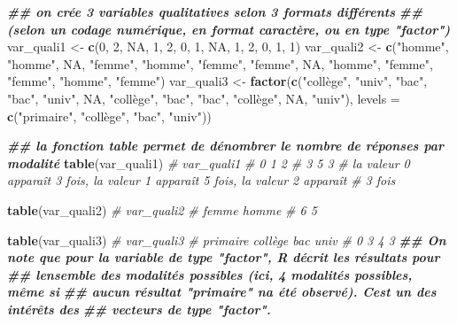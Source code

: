\documentclass[
]{book}
\newenvironment{Shaded}{\begin{snugshade}}{\end{snugshade}}
\newcommand{\AttributeTok}[1]{\textcolor[rgb]{0.13,0.29,0.53}{#1}}
\newcommand{\CommentTok}[1]{\textcolor[rgb]{0.56,0.35,0.01}{\textit{#1}}}
\newcommand{\ConstantTok}[1]{\textcolor[rgb]{0.56,0.35,0.01}{#1}}
\newcommand{\DecValTok}[1]{\textcolor[rgb]{0.00,0.00,0.81}{#1}}
\newcommand{\DocumentationTok}[1]{\textcolor[rgb]{0.56,0.35,0.01}{\textbf{\textit{#1}}}}
\newcommand{\FunctionTok}[1]{\textcolor[rgb]{0.13,0.29,0.53}{\textbf{#1}}}
\newcommand{\NormalTok}[1]{#1}
\newcommand{\OtherTok}[1]{\textcolor[rgb]{0.56,0.35,0.01}{#1}}
\newcommand{\StringTok}[1]{\textcolor[rgb]{0.31,0.60,0.02}{#1}}
\begin{document}
\begin{Shaded}
\begin{Highlighting}[]
\DocumentationTok{\#\# on crée 3 variables qualitatives selon 3 formats différents }
\DocumentationTok{\#\# (selon un codage numérique, en format caractère, ou en type "factor")}
\NormalTok{var\_quali1 }\OtherTok{\textless{}{-}} \FunctionTok{c}\NormalTok{(}\DecValTok{0}\NormalTok{, }\DecValTok{2}\NormalTok{, }\ConstantTok{NA}\NormalTok{, }\DecValTok{1}\NormalTok{, }\DecValTok{2}\NormalTok{, }\DecValTok{0}\NormalTok{, }\DecValTok{1}\NormalTok{, }\ConstantTok{NA}\NormalTok{, }\DecValTok{1}\NormalTok{, }\DecValTok{2}\NormalTok{, }\DecValTok{0}\NormalTok{, }\DecValTok{1}\NormalTok{, }\DecValTok{1}\NormalTok{)}
\NormalTok{var\_quali2 }\OtherTok{\textless{}{-}} \FunctionTok{c}\NormalTok{(}\StringTok{"homme"}\NormalTok{, }\StringTok{"homme"}\NormalTok{, }\ConstantTok{NA}\NormalTok{, }\StringTok{"femme"}\NormalTok{, }\StringTok{"homme"}\NormalTok{, }\StringTok{"femme"}\NormalTok{, }\StringTok{"femme"}\NormalTok{, }\ConstantTok{NA}\NormalTok{, }
                \StringTok{"homme"}\NormalTok{, }\StringTok{"femme"}\NormalTok{, }\StringTok{"femme"}\NormalTok{, }\StringTok{"homme"}\NormalTok{, }\StringTok{"femme"}\NormalTok{)}
\NormalTok{var\_quali3 }\OtherTok{\textless{}{-}} \FunctionTok{factor}\NormalTok{(}\FunctionTok{c}\NormalTok{(}\StringTok{"collège"}\NormalTok{, }\StringTok{"univ"}\NormalTok{, }\StringTok{"bac"}\NormalTok{, }\StringTok{"bac"}\NormalTok{, }\StringTok{"univ"}\NormalTok{, }\ConstantTok{NA}\NormalTok{, }\StringTok{"collège"}\NormalTok{, }
                       \StringTok{"bac"}\NormalTok{, }\StringTok{"bac"}\NormalTok{, }\StringTok{"collège"}\NormalTok{, }\ConstantTok{NA}\NormalTok{, }\StringTok{"univ"}\NormalTok{), }
                     \AttributeTok{levels =} \FunctionTok{c}\NormalTok{(}\StringTok{"primaire"}\NormalTok{, }\StringTok{"collège"}\NormalTok{, }\StringTok{"bac"}\NormalTok{, }\StringTok{"univ"}\NormalTok{))}

\DocumentationTok{\#\# la fonction table permet de dénombrer le nombre de réponses par modalité}
\FunctionTok{table}\NormalTok{(var\_quali1)}
\CommentTok{\# var\_quali1}
\CommentTok{\# 0 1 2 }
\CommentTok{\# 3 5 3}
\CommentTok{\# la valeur 0 apparaît 3 fois, la valeur 1 apparaît 5 fois, la valeur 2 apparaît}
\CommentTok{\# 3 fois}

\FunctionTok{table}\NormalTok{(var\_quali2)}
\CommentTok{\# var\_quali2}
\CommentTok{\# femme homme }
\CommentTok{\#     6     5}

\FunctionTok{table}\NormalTok{(var\_quali3)}
\CommentTok{\# var\_quali3}
\CommentTok{\# primaire  collège      bac     univ }
\CommentTok{\#        0        3        4        3}
\DocumentationTok{\#\# On note que pour la variable de type "factor", R décrit les résultats pour }
\DocumentationTok{\#\# l\textquotesingle{}ensemble des modalités possibles (ici, 4 modalités possibles, même si }
\DocumentationTok{\#\# aucun résultat "primaire" n\textquotesingle{}a été observé). C\textquotesingle{}est un des intérêts des }
\DocumentationTok{\#\# vecteurs de type "factor".}


\end{Highlighting}
\end{Shaded}
\end{document}
